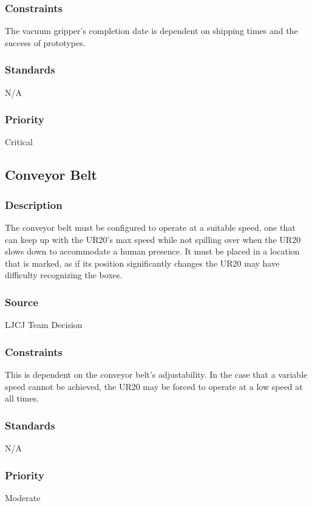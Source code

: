 \subsubsection{Constraints}
The vacuum gripper's completion date is dependent on shipping times and the success of prototypes.
\subsubsection{Standards}
N/A
\subsubsection{Priority}
Critical

\subsection{Conveyor Belt}
\subsubsection{Description}
The conveyor belt must be configured to operate at a suitable speed, one that can keep up with the UR20's max speed while not spilling over when the UR20 slows down to accommodate a human presence. It must be placed in a location that is marked, as if its position significantly changes the UR20 may have difficulty recognizing the boxes.
\subsubsection{Source}
LJCJ Team Decision
\subsubsection{Constraints}
This is dependent on the conveyor belt's adjustability. In the case that a variable speed cannot be achieved, the UR20 may be forced to operate at a low speed at all times.
\subsubsection{Standards}
N/A
\subsubsection{Priority}
Moderate